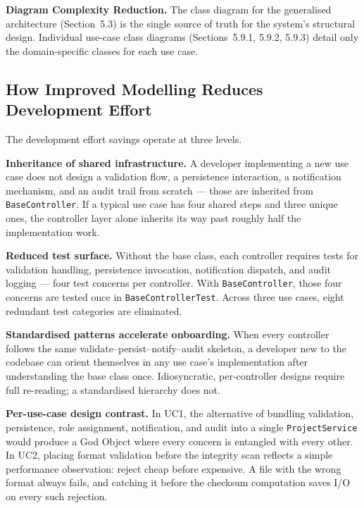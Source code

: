 \documentclass[12pt,a4paper]{article}
\newcommand{\code}[1]{\texttt{\small #1}}
\begin{document}
\noindent\textbf{Diagram Complexity Reduction.}
The class diagram for the generalised architecture (Section~5.3) is the single source of truth for the system's structural design. Individual use-case class diagrams (Sections~5.9.1, 5.9.2, 5.9.3) detail only the domain-specific classes for each use case.

\subsection{How Improved Modelling Reduces Development Effort}

The development effort savings operate at three levels.

\noindent\textbf{Inheritance of shared infrastructure.}
A developer implementing a new use case does not design a validation flow, a persistence interaction, a notification mechanism, and an audit trail from scratch --- those are inherited from \code{BaseController}. If a typical use case has four shared steps and three unique ones, the controller layer alone inherits its way past roughly half the implementation work.

\noindent\textbf{Reduced test surface.}
Without the base class, each controller requires tests for validation handling, persistence invocation, notification dispatch, and audit logging --- four test concerns per controller. With \code{BaseController}, those four concerns are tested once in \code{BaseControllerTest}. Across three use cases, eight redundant test categories are eliminated.

\noindent\textbf{Standardised patterns accelerate onboarding.}
When every controller follows the same validate--persist--notify--audit skeleton, a developer new to the codebase can orient themselves in any use case's implementation after understanding the base class once. Idiosyncratic, per-controller designs require full re-reading; a standardised hierarchy does not.

\noindent\textbf{Per-use-case design contrast.}
In UC1, the alternative of bundling validation, persistence, role assignment, notification, and audit into a single \code{ProjectService} would produce a God Object where every concern is entangled with every other. In UC2, placing format validation before the integrity scan reflects a simple performance observation: reject cheap before expensive. A file with the wrong format always fails, and catching it before the checksum computation saves I/O on every such rejection.
\end{document}
